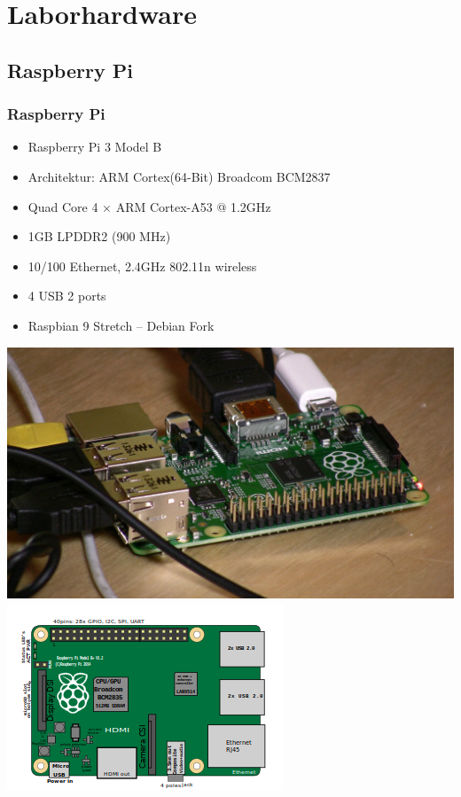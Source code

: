 \documentclass[xcolor=dvipsnames, aspectratio=169]{beamer}
\begin{document}
\section{Laborhardware}
\subsection{Raspberry Pi}
\begin{frame}
	\frametitle{Raspberry Pi}
 \hspace*{-1cm}
\begin{minipage}{0.7\textwidth}
\begin{itemize}
	\item Raspberry Pi 3 Model B
	\item Architektur: ARM Cortex(64-Bit) Broadcom BCM2837
	\item Quad Core 4 $\times$ ARM Cortex-A53 @ 1.2GHz
	\item 1GB LPDDR2 (900 MHz)
	\item 10/100 Ethernet, 2.4GHz 802.11n wireless
	\item 4 USB 2 ports
	\item Raspbian 9 Stretch -- Debian Fork
\end{itemize}
\end{minipage}%
\begin{minipage}{0.3\textwidth}
\includegraphics[scale=0.06]{raspi}
\includegraphics[scale=0.45]{raspib1+}
\end{minipage}\hfill
\end{frame}
\end{document}
